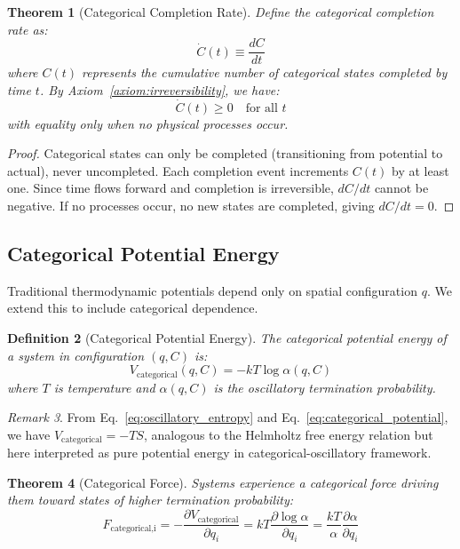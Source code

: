 \documentclass[12pt,a4paper]{article}
\newtheorem{theorem}{Theorem}[section]
\newtheorem{definition}[theorem]{Definition}
\theoremstyle{remark}
\newtheorem{remark}[theorem]{Remark}
\begin{document}
\begin{theorem}[Categorical Completion Rate]
\label{thm:completion_rate}
Define the categorical completion rate as:
\begin{equation}
\dot{C}(t) \equiv \frac{dC}{dt}
\end{equation}
where $C(t)$ represents the cumulative number of categorical states completed by time $t$. By Axiom~\ref{axiom:irreversibility}, we have:
\begin{equation}
\dot{C}(t) \geq 0 \quad \text{for all } t
\label{eq:completion_rate_positive}
\end{equation}
with equality only when no physical processes occur.
\end{theorem}

\begin{proof}
Categorical states can only be completed (transitioning from potential to actual), never uncompleted. Each completion event increments $C(t)$ by at least one. Since time flows forward and completion is irreversible, $dC/dt$ cannot be negative. If no processes occur, no new states are completed, giving $dC/dt = 0$.
\end{proof}

\subsection{Categorical Potential Energy}

Traditional thermodynamic potentials depend only on spatial configuration $q$. We extend this to include categorical dependence.

\begin{definition}[Categorical Potential Energy]
The categorical potential energy of a system in configuration $(q, C)$ is:
\begin{equation}
V_\text{categorical}(q, C) = -kT \log \alpha(q, C)
\label{eq:categorical_potential}
\end{equation}
where $T$ is temperature and $\alpha(q, C)$ is the oscillatory termination probability.
\end{definition}

\begin{remark}
From Eq.~\eqref{eq:oscillatory_entropy} and Eq.~\eqref{eq:categorical_potential}, we have $V_\text{categorical} = -TS$, analogous to the Helmholtz free energy relation but here interpreted as pure potential energy in categorical-oscillatory framework.
\end{remark}

\begin{theorem}[Categorical Force]
\label{thm:categorical_force}
Systems experience a categorical force driving them toward states of higher termination probability:
\begin{equation}
F_\text{categorical,i} = -\frac{\partial V_\text{categorical}}{\partial q_i} = kT \frac{\partial \log \alpha}{\partial q_i} = \frac{kT}{\alpha} \frac{\partial \alpha}{\partial q_i}
\end{equation}
\end{theorem}
\end{document}
